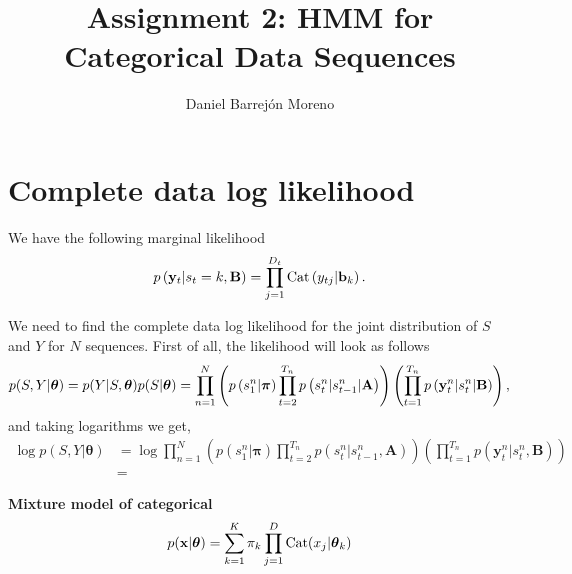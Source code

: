 \documentclass[12pt]{article}
\begin{document}
 
 
 
\title{Assignment 2: HMM for Categorical Data Sequences}
\author{Daniel Barrejón Moreno} 
\maketitle
 
\section{Complete data log likelihood}

\noindent We have the following marginal likelihood
\begin{equation}
p \left( \mathbf { y } _ { t } | s _ { t } = k , \mathbf { B } \right) = \prod _ { j = 1 } ^ { D _ { t } } \operatorname{\operatorname{Cat}} \left( y _ { t j } | \mathbf { b } _ { k } \right).
\end{equation}

\noindent We need to find the complete data log likelihood for the joint distribution of $S$ and $Y$ for $N$ sequences. First of all, the likelihood will look as follows
\begin{equation}
p(S ,Y|\boldsymbol\theta ) = p(Y|S,\boldsymbol\theta)p(S|\boldsymbol\theta)  = \prod _ { n = 1 } ^ { N } \left( p \left( s _ { 1 } ^ { n }|\boldsymbol\pi \right) \prod _ { t = 2 } ^ { T _ { n } } p \left( s _ { t } ^ { n } | s _ { t - 1 } ^ { n } | \mathbf{A} \right) \right) \left( \prod _ { t = 1 } ^ { T _ { n } } p \left( \mathbf { y } _ { t } ^ { n } | s _ { t } ^ { n } | \mathbf{B}\right) \right),
\end{equation}
and taking logarithms we get,
\begin{align}
\log p ( S , Y | \boldsymbol { \theta } ) & = \log \prod _ { n = 1 } ^ { N } \left( p \left( s _ { 1 } ^ { n } | \boldsymbol { \pi } \right) \prod _ { t = 2 } ^ { T _ { n } } p \left( s _ { t } ^ { n } | s _ { t - 1 } ^ { n } , \mathbf { A } \right) \right) \left( \prod _ { t = 1 } ^ { T _ { n } } p \left( \mathbf { y } _ { t } ^ { n } | s _ { t } ^ { n } , \mathbf { B } \right) \right)\\
& = 
\end{align}

\clearpage



 
\textbf{ Mixture model of categorical} \begin{equation}
     p(\mathbf{x}|\boldsymbol\theta) = \sum_{k=1}^{K}\pi_k\prod_{j=1}^{D}\operatorname{\operatorname{Cat}}(x_j|\boldsymbol\theta_k)
 \end{equation}
\end{document}
